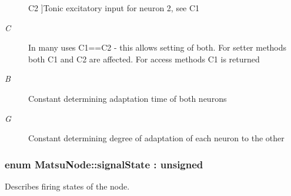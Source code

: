 \begin{Desc}
\begin{description}
{C2\hypertarget{classMatsuNode_aed801e1d0363292efc99bb02f1911386af1a543f5a2c5d49bc5dde298fcf716e4}{}\label{classMatsuNode_aed801e1d0363292efc99bb02f1911386af1a543f5a2c5d49bc5dde298fcf716e4}
}]Tonic excitatory input for neuron 2, see C1 \item[{\em 
C\hypertarget{classMatsuNode_aed801e1d0363292efc99bb02f1911386a0d61f8370cad1d412f80b84d143e1257}{}\label{classMatsuNode_aed801e1d0363292efc99bb02f1911386a0d61f8370cad1d412f80b84d143e1257}
}]In many uses C1==C2 -\/ this allows setting of both. For setter methods both C1 and C2 are affected. For access methods C1 is returned \item[{\em 
B\hypertarget{classMatsuNode_aed801e1d0363292efc99bb02f1911386a9d5ed678fe57bcca610140957afab571}{}\label{classMatsuNode_aed801e1d0363292efc99bb02f1911386a9d5ed678fe57bcca610140957afab571}
}]Constant determining adaptation time of both neurons \item[{\em 
G\hypertarget{classMatsuNode_aed801e1d0363292efc99bb02f1911386adfcf28d0734569a6a693bc8194de62bf}{}\label{classMatsuNode_aed801e1d0363292efc99bb02f1911386adfcf28d0734569a6a693bc8194de62bf}
}]Constant determining degree of adaptation of each neuron to the other \end{description}
\end{Desc}
\subsubsection[{\texorpdfstring{signal\+State}{signalState}}]{\setlength{\rightskip}{0pt plus 5cm}enum {\bf Matsu\+Node\+::signal\+State} \+: unsigned\hspace{0.3cm}{\ttfamily [strong]}}\hypertarget{classMatsuNode_abd587a4a72c6774f689d21c78a8bc239}{}\label{classMatsuNode_abd587a4a72c6774f689d21c78a8bc239}


Describes firing states of the node. 

